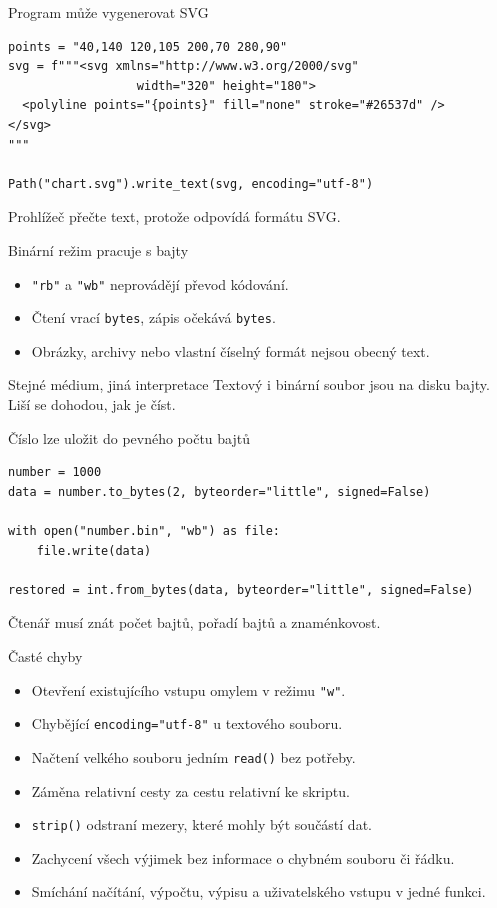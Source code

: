 \documentclass[aspectratio=169]{beamer}
\begin{document}
\begin{frame}[fragile]{Program může vygenerovat SVG}
\begin{lstlisting}[style=pythonSmall]
points = "40,140 120,105 200,70 280,90"
svg = f"""<svg xmlns="http://www.w3.org/2000/svg"
                  width="320" height="180">
  <polyline points="{points}" fill="none" stroke="#26537d" />
</svg>
"""

Path("chart.svg").write_text(svg, encoding="utf-8")
\end{lstlisting}
  Prohlížeč přečte text, protože odpovídá formátu SVG.
\end{frame}

\begin{frame}{Binární režim pracuje s bajty}
  \begin{itemize}
    \item \texttt{"rb"} a \texttt{"wb"} neprovádějí převod kódování.
    \item Čtení vrací \texttt{bytes}, zápis očekává \texttt{bytes}.
    \item Obrázky, archivy nebo vlastní číselný formát nejsou obecný text.
  \end{itemize}
  \begin{block}{Stejné médium, jiná interpretace}
    Textový i binární soubor jsou na disku bajty. Liší se dohodou, jak je číst.
  \end{block}
\end{frame}

\begin{frame}[fragile]{Číslo lze uložit do pevného počtu bajtů}
\begin{lstlisting}[style=python]
number = 1000
data = number.to_bytes(2, byteorder="little", signed=False)

with open("number.bin", "wb") as file:
    file.write(data)

restored = int.from_bytes(data, byteorder="little", signed=False)
\end{lstlisting}
  Čtenář musí znát počet bajtů, pořadí bajtů a znaménkovost.
\end{frame}

\begin{frame}{Časté chyby}
  \begin{itemize}
    \item Otevření existujícího vstupu omylem v režimu \texttt{"w"}.
    \item Chybějící \texttt{encoding="utf-8"} u textového souboru.
    \item Načtení velkého souboru jedním \texttt{read()} bez potřeby.
    \item Záměna relativní cesty za cestu relativní ke skriptu.
    \item \texttt{strip()} odstraní mezery, které mohly být součástí dat.
    \item Zachycení všech výjimek bez informace o chybném souboru či řádku.
    \item Smíchání načítání, výpočtu, výpisu a uživatelského vstupu v jedné funkci.
  \end{itemize}
\end{frame}
\end{document}
